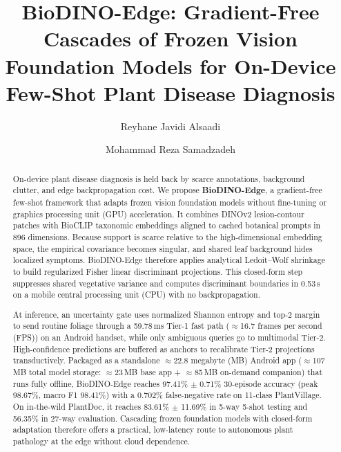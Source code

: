 \documentclass[preprint,12pt]{elsarticle}
\begin{document}
\begin{frontmatter}

\title{BioDINO-Edge: Gradient-Free Cascades of Frozen Vision Foundation Models for On-Device Few-Shot Plant Disease Diagnosis}

\author[1]{Reyhane Javidi Alsaadi}

\author[1]{Mohammad Reza Samadzadeh}



\begin{abstract}
On-device plant disease diagnosis is held back by scarce annotations, background clutter, and edge backpropagation cost. We propose \textbf{BioDINO-Edge}, a gradient-free few-shot framework that adapts frozen vision foundation models without fine-tuning or graphics processing unit (GPU) acceleration. It combines DINOv2 lesion-contour patches with BioCLIP taxonomic embeddings aligned to cached botanical prompts in 896 dimensions. Because support is scarce relative to the high-dimensional embedding space, the empirical covariance becomes singular, and shared leaf background hides localized symptoms. BioDINO-Edge therefore applies analytical Ledoit--Wolf shrinkage to build regularized Fisher linear discriminant projections. This closed-form step suppresses shared vegetative variance and computes discriminant boundaries in 0.53\,s on a mobile central processing unit (CPU) with no backpropagation.

At inference, an uncertainty gate uses normalized Shannon entropy and top-2 margin to send routine foliage through a 59.78\,ms Tier-1 fast path ($\approx$16.7 frames per second (FPS)) on an Android handset, while only ambiguous queries go to multimodal Tier-2. High-confidence predictions are buffered as anchors to recalibrate Tier-2 projections transductively. Packaged as a standalone $\approx$22.8 megabyte (MB) Android app ($\approx$107\,MB total model storage: $\approx$23\,MB base app + $\approx$85\,MB on-demand companion) that runs fully offline, BioDINO-Edge reaches 97.41\% $\pm$ 0.71\% 30-episode accuracy (peak 98.67\%, macro F1 98.41\%) with a 0.702\% false-negative rate on 11-class PlantVillage. On in-the-wild PlantDoc, it reaches 83.61\% $\pm$ 11.69\% in 5-way 5-shot testing and 56.35\% in 27-way evaluation. Cascading frozen foundation models with closed-form adaptation therefore offers a practical, low-latency route to autonomous plant pathology at the edge without cloud dependence.
\end{abstract}


\end{frontmatter}
\end{document}
